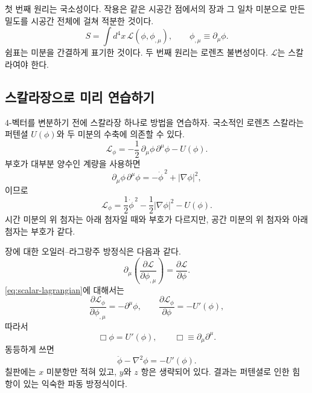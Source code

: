 첫 번째 원리는 국소성이다. 작용은 같은 시공간 점에서의 장과 그 일차 미분으로 만든 밀도를 시공간 전체에 걸쳐 적분한 것이다.
\begin{equation}
S=\int d^4x\,\mathcal L(\phi,\phi_{,\mu}),
\qquad
\phi_{,\mu}\equiv\partial_\mu\phi.
\label{eq:local-action}
\end{equation}
쉼표는 미분을 간결하게 표기한 것이다. 두 번째 원리는 로렌츠 불변성이다. \(\mathcal L\)는 스칼라여야 한다.

\subsection{스칼라장으로 미리 연습하기}

4-벡터를 변분하기 전에 스칼라장 하나로 방법을 연습하자. 국소적인 로렌츠 스칼라는 퍼텐셜 \(U(\phi)\)와 두 미분의 수축에 의존할 수 있다.
\begin{equation}
\mathcal L_\phi
=
-\frac12\,\partial_\mu\phi\,\partial^\mu\phi-U(\phi).
\label{eq:scalar-lagrangian}
\end{equation}
부호가 대부분 양수인 계량을 사용하면
\begin{equation}
\partial_\mu\phi\,\partial^\mu\phi
=
-\dot\phi^{\,2}+|\nabla\phi|^2,
\end{equation}
이므로
\begin{equation}
\mathcal L_\phi
=
\frac12\dot\phi^{\,2}
-\frac12|\nabla\phi|^2
-U(\phi).
\end{equation}
시간 미분의 위 첨자는 아래 첨자일 때와 부호가 다르지만, 공간 미분의 위 첨자와 아래 첨자는 부호가 같다.

\begin{classroomqa}
\end{classroomqa}

장에 대한 오일러--라그랑주 방정식은 다음과 같다.
\begin{equation}
\partial_\mu\left(
\frac{\partial\mathcal L}{\partial\phi_{,\mu}}
\right)
=
\frac{\partial\mathcal L}{\partial\phi}.
\label{eq:field-el}
\end{equation}
\eqref{eq:scalar-lagrangian}에 대해서는
\begin{equation}
\frac{\partial\mathcal L_\phi}{\partial\phi_{,\mu}}
=
-\partial^\mu\phi,
\qquad
\frac{\partial\mathcal L_\phi}{\partial\phi}
=
-U'(\phi),
\end{equation}
따라서
\begin{equation}
\Box\phi=U'(\phi),
\qquad
\Box\equiv\partial_\mu\partial^\mu.
\end{equation}
동등하게 쓰면
\begin{equation}
\ddot\phi-\nabla^2\phi=-U'(\phi).
\label{eq:scalar-wave}
\end{equation}
칠판에는 \(x\) 미분항만 적혀 있고, \(y\)와 \(z\) 항은 생략되어 있다. 결과는 퍼텐셜로 인한 힘 항이 있는 익숙한 파동 방정식이다.

